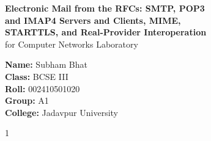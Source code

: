 \documentclass[11pt,a4paper]{article}
\begin{document}
\begin{titlepage}
    \centering
    \vspace*{4.2cm}

    {\LARGE \textbf{Electronic Mail from the RFCs: SMTP, POP3}}\\[0.7em]
    {\LARGE \textbf{and IMAP4 Servers and Clients, MIME,}}\\[0.7em]
    {\LARGE \textbf{STARTTLS, and Real-Provider Interoperation}}\\[1.4em]

    {\large for Computer Networks Laboratory}

    \vspace{3.8cm}

    {\large
    \textbf{Name:} Subham Bhat\\[0.55em]
    \textbf{Class:} BCSE III\\[0.55em]
    \textbf{Roll:} 002410501020\\[0.55em]
    \textbf{Group:} A1\\[0.55em]
    \textbf{College:} Jadavpur University
    }

    \vfill
    {\normalsize 1}
\end{titlepage}

\setcounter{page}{2}
\tableofcontents
\newpage

\setcounter{page}{3}
\end{document}
